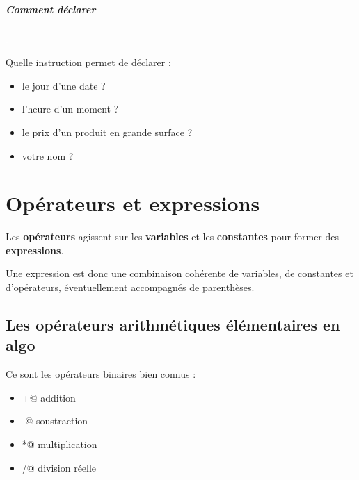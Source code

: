 \documentclass[11pt,a4paper]{article}
\begin{document}
            \par
        
			
		\subparagraph{Comment d\'eclarer} 
		
                \textcolor{white}{.} \par
            
							  Quelle instruction permet de d\'eclarer :
							
					\begin{itemize}
				
			\item le jour d'une date ? \textcolor{gray}{\underline{\hspace*{10em}}} 
			\item l'heure d'un moment ?  \textcolor{gray}{\underline{\hspace*{10em}}} 
			\item le prix d'un produit en grande surface ? \textcolor{gray}{\underline{\hspace*{10em}}} 
			\item votre nom ?  \textcolor{gray}{\underline{\hspace*{10em}}} 
					\end{itemize}
				\section{Op\'erateurs et expressions}
				Les \textbf{op\'erateurs} agissent sur les \textbf{variables} 
				et les \textbf{constantes} pour former des \textbf{expressions}. 
      
            \par
        
				Une expression est donc une combinaison coh\'erente de variables, de constantes et d'op\'erateurs,
				\'eventuellement accompagn\'es de parenth\`eses.
			
            \par
        \subsection{Les op\'erateurs arithm\'etiques \'el\'ementaires en algo}
          Ce sont les op\'erateurs binaires bien connus :
          
					\begin{itemize}
				
			\item \verb@+@ addition
			\item \verb@-@ soustraction
			\item \verb@*@ multiplication
			\item \verb@/@ division r\'eelle
					\end{itemize}
				
\end{document}
